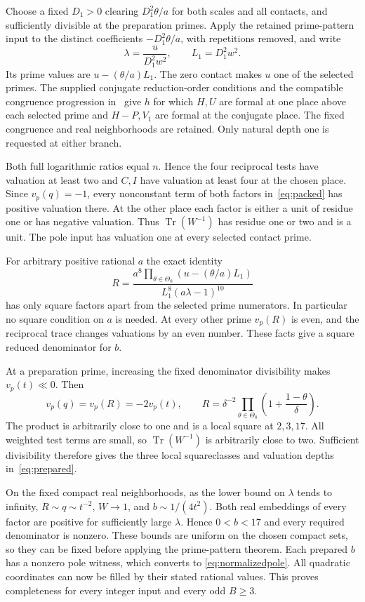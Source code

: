 \documentclass[11pt,a4paper]{article}
\DeclareMathOperator{\Tr}{Tr}\DeclareMathOperator{\Nm}{N}
\begin{document}
Choose a fixed $D_1>0$ clearing $D_1^2\theta/a$ for both scales and
all contacts, and sufficiently divisible at the preparation primes.
Apply the retained prime-pattern input to the distinct coefficients
$-D_1^2\theta/a$, with repetitions removed, and write
\[
                \lambda=\frac{u}{D_1^2w^2},\qquad L_1=D_1^2w^2.
\]
Its prime values are $u-(\theta/a)L_1$. The zero contact makes $u$
one of the selected primes. The supplied conjugate reduction-order
conditions and the compatible congruence progression in~\cite{Dependencies}
give $h$ for which $H,U$ are formal at one place above each selected
prime and $H-P,V_1$ are formal at the conjugate place. The fixed
congruence and real neighborhoods are retained. Only natural depth one
is requested at either branch.

Both full logarithmic ratios equal $n$. Hence the four reciprocal
tests have valuation at least two and $C,I$ have valuation at least
four at the chosen place. Since $v_p(q)=-1$, every nonconstant term
of both factors in~\eqref{eq:packed} has positive valuation there.
At the other place each factor is either a unit of residue one or has
negative valuation. Thus $\Tr(W^{-1})$ has residue one or two and is
a unit. The pole input has valuation one at every selected contact prime.

For arbitrary positive rational $a$ the exact identity
\begin{equation}\label{eq:primeproduct}
 R=\frac{a^8\prod_{\theta\in\Theta_8}(u-(\theta/a)L_1)}
             {L_1^8(a\lambda-1)^{10}}
\end{equation}
has only square factors apart from the selected prime numerators.
In particular no square condition on $a$ is needed. At every other
prime $v_p(R)$ is even, and the reciprocal trace changes valuations
by an even number. These facts give a square reduced denominator for $b$.

At a preparation prime, increasing the fixed denominator divisibility
makes $v_p(t)\ll0$. Then
\[
 v_p(q)=v_p(R)=-2v_p(t),\qquad
 R=\delta^{-2}\prod_{\theta\in\Theta_8}
                   \left(1+\frac{1-\theta}{\delta}\right).
\]
The product is arbitrarily close to one and is a local square at
$2,3,17$. All weighted test terms are small, so $\Tr(W^{-1})$ is
arbitrarily close to two. Sufficient divisibility therefore gives the
three local squareclasses and valuation depths in~\eqref{eq:prepared}.

On the fixed compact real neighborhoods, as the lower bound on $\lambda$
tends to infinity, $R\sim q\sim t^{-2}$, $W\to1$, and
$b\sim1/(4t^2)$. Both real embeddings of every factor are positive
for sufficiently large $\lambda$. Hence $0<b<17$ and every required
denominator is nonzero. These bounds are uniform on the chosen compact
sets, so they can be fixed before applying the prime-pattern theorem.
Each prepared $b$ has a nonzero pole witness, which converts to
\eqref{eq:normalizedpole}. All quadratic coordinates can now be filled
by their stated rational values. This proves completeness for every
integer input and every odd $B\ge3$.
\end{document}
